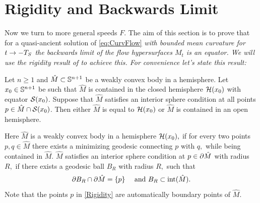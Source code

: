 \documentclass{amsart}
\begin{document}
\section{Rigidity and Backwards Limit}\label{sec:rigidity}
Now we turn to more general speeds \(F\). The aim of this section is to prove that for a quasi-ancient solution of \eqref{eq:CurvFlow} \it{with bounded mean curvature} for $t\ra -T_S$ the backwards limit of the flow hypersurfaces $M_t$  is an equator. We will use the rigidity result of \cite{MakowskiScheuer:/2013} to achieve this. For convenience let's state this result:
\begin{thm}\label{Rigidity}\textsc{\cite[Thm.~1.1]{MakowskiScheuer:/2013}}
Let $ n\geq 1$ and $\hat{M}\subset \S^{n+1}$ be a weakly convex body in a hemisphere. Let $x_0\in \S^{n+1}$ be such that $\hat{M}$ is contained in the closed hemisphere $\mc{H}(x_0)$ with equator $\mc{S}(x_{0})$. Suppose that $\hat{M}$ satisfies an interior sphere condition at all points $p\in \hat{M} \cap \mc{S}(x_0)$. Then either $\hat{M}$ is equal to $\mc{H}(x_0)$ or $\hat{M}$ is contained in an open hemisphere.
\end{thm}
Here $\hat{M}$ is a weakly convex body in a hemisphere $\mc{H}(x_0),$ if for every two points $p,q\in\hat{M}$ there exists a minimizing geodesic connecting $p$ with $q,$ while being contained in $\hat{M}.$ $\hat{M}$ satisfies an interior sphere condition at $p\in \del\hat{M}$ with radius $R,$ if there exists a geodesic ball $B_R$ with radius $R,$ such that
\[\del B_R\cap\del \hat{M}=\{p\}\quad~\text{and}~B_R\sub\mrm{int}(\hat{M}). \]
Note that the points $p$ in \cref{Rigidity} are automatically boundary points of $\hat{M}.$
\end{document}
